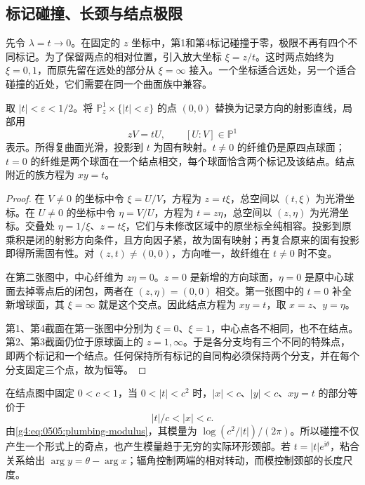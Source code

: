 \subsection{标记碰撞、长颈与结点极限}
\label{g4:subsec:0605:03}
先令 \(\lambda=t\to0\)。在固定的 \(z\) 坐标中，第1和第4标记碰撞于零，极限不再有四个不同标记。为了保留两点的相对位置，引入放大坐标 \(\xi=z/t\)。这时两点始终为 \(\xi=0,1\)，而原先留在远处的部分从 \(\xi=\infty\) 接入。一个坐标适合远处，另一个适合碰撞的近处，它们需要在同一个曲面族中兼容。

\begin{proposition}
	\label{g4:prop:0605:node-family}
	取 \(|t|<\varepsilon<1/2\)。将 \(\mathbb P^1_z\times\{|t|<\varepsilon\}\) 的点 \((0,0)\) 替换为记录方向的射影直线，局部用
	\[
		zV=tU,\qquad [U:V]\in\mathbb P^1
	\]
	表示。所得复曲面光滑，投影到 \(t\) 为固有映射。\(t\ne0\) 的纤维仍是原四点球面；\(t=0\) 的纤维是两个球面在一个结点相交，每个球面恰含两个标记及该结点。结点附近的族方程为 \(xy=t\)。
\end{proposition}
\begin{proof}
	在 \(V\ne0\) 的坐标中令 \(\xi=U/V\)，方程为 \(z=t\xi\)，总空间以 \((t,\xi)\) 为光滑坐标。在 \(U\ne0\) 的坐标中令 \(\eta=V/U\)，方程为 \(t=z\eta\)，总空间以 \((z,\eta)\) 为光滑坐标。交叠处 \(\eta=1/\xi\)、\(z=t\xi\)，它们与未修改区域中的原坐标全纯相容。投影到原乘积是闭的射影方向条件，且方向因子紧，故为固有映射；再复合原来的固有投影即得所需固有性。对 \((z,t)\ne(0,0)\)，方向唯一，故纤维在 \(t\ne0\) 时不变。

	在第二张图中，中心纤维为 \(z\eta=0\)。\(z=0\) 是新增的方向球面，\(\eta=0\) 是原中心球面去掉零点后的闭包，两者在 \((z,\eta)=(0,0)\) 相交。第一张图中的 \(t=0\) 补全新增球面，其 \(\xi=\infty\) 就是这个交点。因此结点方程为 \(xy=t\)，取 \(x=z\)、\(y=\eta\)。

	第1、第4截面在第一张图中分别为 \(\xi=0\)、\(\xi=1\)，中心点各不相同，也不在结点。第2、第3截面仍位于原球面上的 \(z=1,\infty\)。于是各分支均有三个不同的特殊点，即两个标记和一个结点。任何保持所有标记的自同构必须保持两个分支，并在每个分支固定三个点，故为恒等。
\end{proof}

在结点图中固定 \(0<c<1\)，当 \(0<|t|<c^2\) 时，\(|x|<c\)、\(|y|<c\)、\(xy=t\) 的部分等价于
\[
	|t|/c<|x|<c.
\]
由\eqref{g4:eq:0505:plumbing-modulus}，其模量为 \(\log(c^2/|t|)/(2\pi)\)。所以碰撞不仅产生一个形式上的奇点，也产生模量趋于无穷的实际环形颈部。若 \(t=|t|e^{\mathrm{i}\theta}\)，粘合关系给出 \(\arg y=\theta-\arg x\)；辐角控制两端的相对转动，而模控制颈部的长度尺度。

